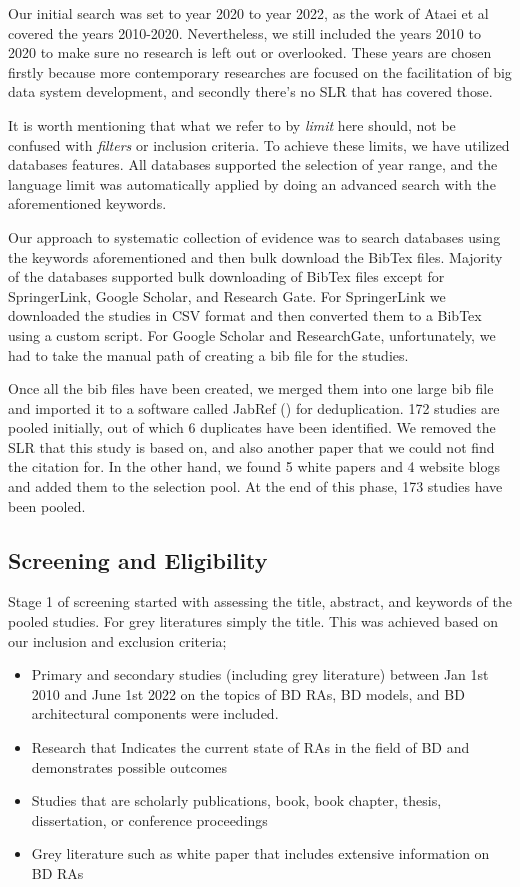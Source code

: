 \documentclass[review]{elsarticle}
\begin{document}
Our initial search was set to year 2020 to year 2022, as the work of Ataei et al \cite{AtaeiACIS} covered the years 2010-2020. Nevertheless, we still included the years 2010 to 2020 to make sure no research is left out or overlooked. These years are chosen firstly because more contemporary researches are focused on the facilitation of big data system development, and secondly there's no SLR that has covered those.

It is worth mentioning that what we refer to by \textit{limit} here should, not be confused with \textit{filters} or inclusion criteria. To achieve these limits, we have utilized databases features. All databases supported the selection of year range, and the language limit was automatically applied by doing an advanced search with the aforementioned keywords.

Our approach to systematic collection of evidence was to search databases using the keywords aforementioned and then bulk download the BibTex files. Majority of the databases supported bulk downloading of BibTex files except for SpringerLink, Google Scholar, and Research Gate. For SpringerLink we downloaded the studies in CSV format and then converted them to a BibTex using a custom script. For Google Scholar and ResearchGate, unfortunately, we had to take the manual path of creating a bib file for the studies. 

Once all the bib files have been created, we merged them into one large bib file and imported it to a software called JabRef (\cite{JabRef}) for deduplication. 172 studies are pooled initially, out of which 6 duplicates have been identified. We removed the SLR that this study is based on, and also another paper that we could not find the citation for. In the other hand, we found 5 white papers and 4 website blogs and added them to the selection pool. At the end of this phase, 173 studies have been pooled. 

\subsection{Screening and Eligibility}

Stage 1 of screening started with assessing the title, abstract, and keywords of the pooled studies. For grey literatures simply the title. This was achieved based on our inclusion and exclusion criteria; 

\begin{itemize}
    \item Primary and secondary studies (including grey literature) between Jan 1st 2010 and June 1st 2022 on the topics of BD RAs, BD models, and BD architectural components were included. 
    \item Research that Indicates the current state of RAs in the field of BD and demonstrates possible outcomes
    \item Studies that are scholarly publications, book, book chapter, thesis, dissertation, or conference proceedings 
    \item Grey literature such as white paper that includes extensive information on BD RAs
\end{itemize}
\end{document}
